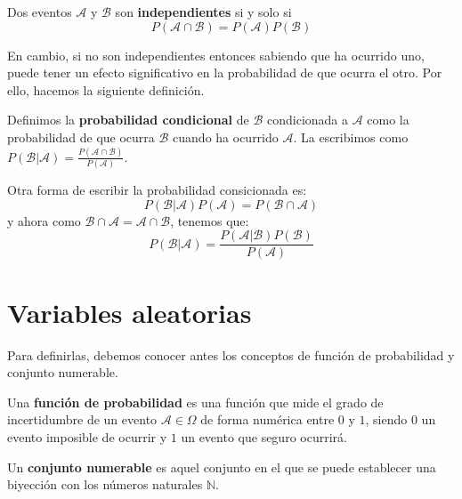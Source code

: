 \begin{definicion}
Dos eventos $\mathcal{A}$ y $\mathcal{B}$ son \textbf{independientes} si y solo si
\[ P(\mathcal{A} \cap \mathcal{B})=P(\mathcal{A})P(\mathcal{B}) \]
\end{definicion}
En cambio, si no son independientes entonces sabiendo que ha ocurrido uno, puede tener un efecto significativo en la probabilidad de que ocurra el otro. Por ello, hacemos la siguiente definición. \cite{forsyth2018probability}
\begin{definicion}
Definimos la \textbf{probabilidad condicional} de $\mathcal{B}$ condicionada a $\mathcal{A}$ como la probabilidad de que ocurra $\mathcal{B}$ cuando ha ocurrido $\mathcal{A}$. La escribimos como $P(\mathcal{B}\vert \mathcal{A})=\frac{P(\mathcal{A} \cap \mathcal{B})}{P(\mathcal{A})}$.
\end{definicion}
Otra forma de escribir la probabilidad consicionada es:
\[ P(\mathcal{B}\vert \mathcal{A})P(\mathcal{A})=P(\mathcal{B} \cap \mathcal{A}) \]
y ahora como $\mathcal{B} \cap \mathcal{A}=\mathcal{A} \cap \mathcal{B}$, tenemos que:
\[ P(\mathcal{B}\vert \mathcal{A})=\frac{P(\mathcal{A}\vert \mathcal{B})P(\mathcal{B})}{P(\mathcal{A})} \]

\section{Variables aleatorias}
Para definirlas, debemos conocer antes los conceptos de función de probabilidad y conjunto numerable.
\begin{definicion}
Una \textbf{función de probabilidad} es una función que mide el grado de incertidumbre de un evento $\mathcal{A} \in \Omega$ de forma numérica entre $0$ y $1$, siendo $0$ un evento imposible de ocurrir y $1$ un evento que seguro ocurrirá.
\end{definicion}

\begin{definicion}
Un \textbf{conjunto numerable} es aquel conjunto en el que se puede establecer una biyección con los números naturales $\mathbb{N}$.
\end{definicion}

